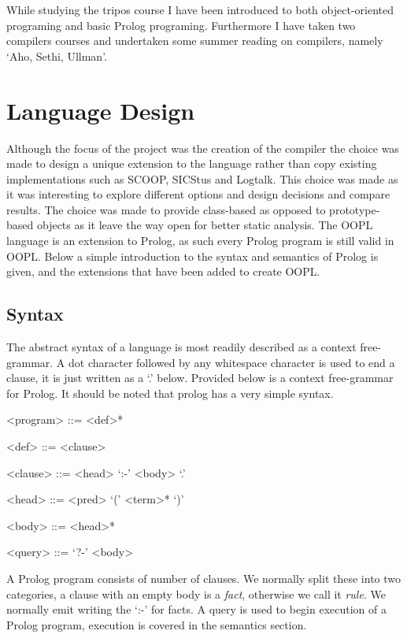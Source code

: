 \documentclass[12pt,a4paper,twoside,openright]{report}
\begin{document}
While studying the tripos course I have been introduced to both object-oriented programing and basic Prolog programing. Furthermore I have taken two compilers courses and undertaken some summer reading on compilers, namely `Aho, Sethi, Ullman'\cite{DRAGON}.

\section {Language Design}

Although the focus of the project was the creation of the compiler the choice was made to design a unique extension to the language rather than copy existing implementations such as SCOOP, SICStus and Logtalk. This choice was made as it was interesting to explore different options and design decisions and compare results. The choice was made to provide class-based as opposed to prototype-based objects as it leave the way open for better static analysis. The OOPL language is an extension to Prolog, as such every Prolog program is still valid in OOPL. Below a simple introduction to the syntax and semantics of Prolog is given, and the extensions that have been added to create OOPL.

\subsection {Syntax}

The abstract syntax of a language is most readily described as a context free-grammar. A dot character followed by any whitespace character is used to end a clause, it is just written as a `.' below. Provided below is a context free-grammar for Prolog. It should be noted that prolog has a very simple syntax.

\begin{grammar}

<program> ::= <def>*
		
<def> ::= <clause>
		
<clause> ::= <head> `:-' <body> `.'
		
<head> 	::= <pred> `(' <term>* `)'
		
<body> ::= <head>*

<query> ::= `?-' <body>

\end{grammar}		

A Prolog program consists of number of clauses. We normally split these into two categories, a clause with an empty body is a \emph{fact}, otherwise we call it \emph{rule}. We normally emit writing the `:-' for facts. A query is used to begin execution of a Prolog program, execution is covered in the semantics section.
\end{document}
